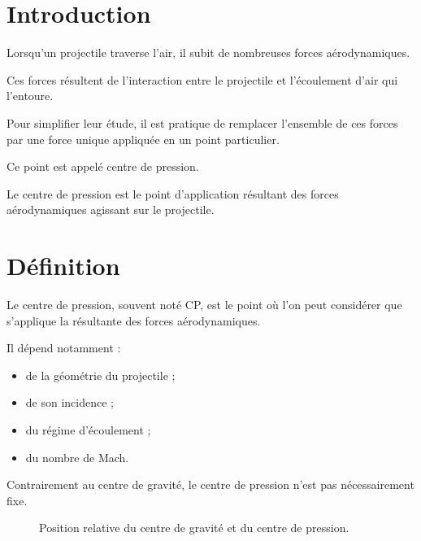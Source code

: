 
\section{Introduction}

Lorsqu'un projectile traverse l'air, il subit de nombreuses forces
aérodynamiques.

Ces forces résultent de l'interaction entre le projectile et l'écoulement
d'air qui l'entoure.

Pour simplifier leur étude, il est pratique de remplacer l'ensemble de ces
forces par une force unique appliquée en un point particulier.

Ce point est appelé centre de pression.

\begin{aretenir}

Le centre de pression est le point d'application résultant des forces
aérodynamiques agissant sur le projectile.

\end{aretenir}

\section{Définition}

Le centre de pression, souvent noté CP, est le point où l'on peut considérer
que s'applique la résultante des forces aérodynamiques.

Il dépend notamment :

\begin{itemize}
    \item de la géométrie du projectile ;
    \item de son incidence ;
    \item du régime d'écoulement ;
    \item du nombre de Mach.
\end{itemize}

Contrairement au centre de gravité, le centre de pression n'est pas
nécessairement fixe.

\begin{figure}[htbp]
\centering
{}
\caption{Position relative du centre de gravité et du centre de pression.}
\label{fig:cg_cp}
\end{figure}

